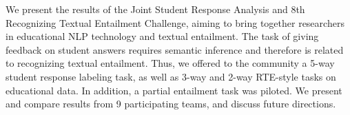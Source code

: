 We present the results of the Joint Student Response Analysis and 8th Recognizing Textual Entailment Challenge, aiming to bring together researchers
 in educational NLP technology and textual entailment. The task of giving
 feedback on student answers requires semantic inference and therefore is
 related to recognizing textual entailment. Thus, we offered to the community a
 5-way student response labeling task, as well as 3-way and 2-way RTE-style
 tasks on educational data. In addition, a partial entailment task was piloted.
 We present and compare results from 9 participating teams, and discuss future
 directions.


